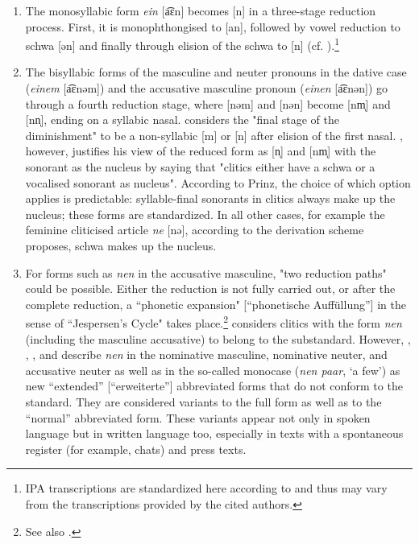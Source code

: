 \begin{enumerate}
\item The monosyllabic form \textit{ein} [a͡ɛn] becomes [n] in a three-stage reduction process. 
First, it is monophthongised to [an], followed by vowel reduction to schwa [ən] and finally through elision of the schwa to [n] (cf. \citealt[47]{Dedenbach1987}).\footnote{
	IPA transcriptions are standardized here according to \citet{KrechEa2009} and thus may vary from the transcriptions provided by the cited authors.}
\item The bisyllabic forms of the masculine and neuter pronouns in the dative case (\textit{einem} [a͡ɛnəm]) and the accusative masculine pronoun (\textit{einen} [a͡ɛnən]) go through a fourth reduction stage, where [nəm] and [nən] become [nm̩] and [nn̩], ending on a syllabic nasal. 
\citet[48]{Dedenbach1987} considers the "final stage of the diminishment" to be a non-syllabic [m] or [n] after elision of the first nasal.
\citet[93]{Prinz1991}, however, justifies his view of the reduced form as [n̩] and [nm̩] with the sonorant as the nucleus by saying that "clitics either have a schwa or a vocalised sonorant as nucleus".
According to Prinz, the choice of which option applies is predictable: syllable-final sonorants in clitics always make up the nucleus; these forms are standardized.
In all other cases, for example the feminine cliticised article \textit{ne} [nə], according to the derivation scheme \citet[92]{Prinz1991} proposes, schwa makes up the nucleus.
\item For forms such as \textit{nen} in the accusative masculine, "two reduction paths" \citep[76]{Ziegler2011} could be possible. 
Either the reduction is not fully carried out, or after the complete reduction, a ``phonetic expansion" [``phonetische Auffüllung''] in the sense of ``Jespersen's Cycle" takes place.\footnote{
	See also \citet[189]{Vogel2006}.}
\citet[84]{Prinz1991} considers clitics with the form \textit{nen} (including the masculine accusative) to belong to the substandard. 
However, \citet{Vogel2006}, \citet{Burri2003}, \citet{Tophinke2002}, and \citet{Ziegler2011,Ziegler2012} describe \textit{nen} in the nominative masculine, nominative neuter, and accusative neuter as well as in the so-called monocase (\textit{nen paar}, `a few') as new ``extended'' [``erweiterte''] abbreviated forms that do not conform to the standard. 
They are considered variants to the full form as well as to the ``normal'' abbreviated form. 
These variants appear not only in spoken language but in written language too, especially in texts with a spontaneous register (for example, chats) and press texts.
\end{enumerate}

